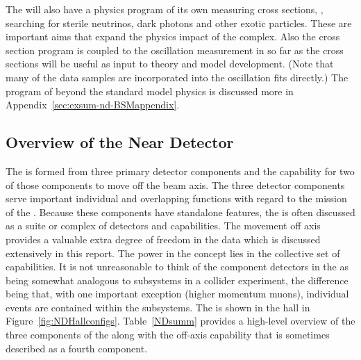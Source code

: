 The   will also have a physics program of its own measuring cross sections, , searching for sterile neutrinos, dark photons and other exotic particles. These are important aims that expand the physics impact of the  complex.  Also the cross section program is coupled to the oscillation measurement in so far as the cross sections will be useful as input to theory and model %
 development.   (Note that many of the  data samples are incorporated into the oscillation fits directly.) The   program of beyond the standard model physics is discussed more in Appendix~\ref{sec:exsum-nd-BSMappendix}.


\subsection{Overview of the Near Detector}
\label{sec:BriefOverview}

The   is formed from three primary detector components and the capability for two of those components to move off the beam axis. The three detector components serve important individual and overlapping functions with regard to the mission of the .  Because these components have standalone features, the   is often discussed as a suite or complex of detectors and capabilities.  The movement off axis provides a valuable extra degree of freedom in the data which is discussed extensively in this report.  The power in the   concept lies in the collective set of capabilities.  It is not unreasonable to think of the component detectors in the   as being somewhat analogous to subsystems in a collider experiment, the difference being that, with one important exception (higher momentum muons), individual events are contained within the subsystems.  
The   is shown in the   hall in Figure~\ref{fig:NDHallconfigs}.  Table~\ref{NDsumm} provides a high-level overview of the three components of the   along with the off-axis capability that is sometimes described as a fourth component.  

